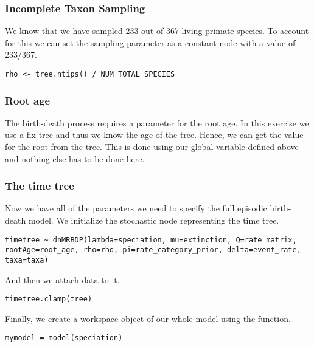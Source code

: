 \subsubsection{Incomplete Taxon Sampling}

We know that we have sampled 233 out of 367 living primate species.
To account for this we can set the sampling parameter as a constant node with a value of 233/367.
{\tt \begin{snugshade*}
\begin{lstlisting}
rho <- tree.ntips() / NUM_TOTAL_SPECIES
\end{lstlisting}
\end{snugshade*}}


\subsubsection{Root age}

The birth-death process requires a parameter for the root age.
In this exercise we use a fix tree and thus we know the age of the tree.
Hence, we can get the value for the root from the \citet{MagnusonFord2012} tree.
This is done using our global variable  defined above and nothing else has to be done here.

\subsubsection{The time tree}

Now we have all of the parameters we need to specify the full episodic birth-death model.
We initialize the stochastic node representing the time tree.
{\tt \begin{snugshade*}
\begin{lstlisting}
timetree ~ dnMRBDP(lambda=speciation, mu=extinction, Q=rate_matrix, rootAge=root_age, rho=rho, pi=rate_category_prior, delta=event_rate, taxa=taxa)
\end{lstlisting}
\end{snugshade*}}
And then we attach data to it.
{\tt \begin{snugshade*}
\begin{lstlisting}
timetree.clamp(tree)
\end{lstlisting}
\end{snugshade*}}



Finally, we create a workspace object of our whole model using the  function.
{\tt \begin{snugshade*}
\begin{lstlisting}
mymodel = model(speciation)
\end{lstlisting}
\end{snugshade*}}

